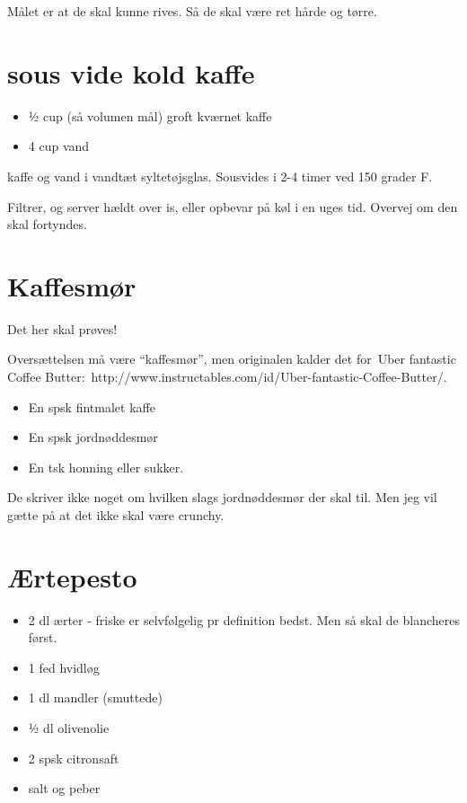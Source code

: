 \documentclass[
  letterpaper,
  DIV=11,
  numbers=noendperiod]{scrreprt}
\providecommand{\tightlist}{%
  \setlength{\itemsep}{0pt}\setlength{\parskip}{0pt}}\usepackage{longtable,booktabs,array}
\begin{document}
Målet er at de skal kunne rives. Så de skal være ret hårde og tørre.

\hypertarget{sous-vide-kold-kaffe}{%
\section{sous vide kold kaffe}\label{sous-vide-kold-kaffe}}

\begin{itemize}
\tightlist
\item
  ½ cup (så volumen mål) groft kværnet kaffe
\item
  4 cup vand
\end{itemize}

kaffe og vand i vandtæt syltetøjsglas. Sousvides i 2-4 timer ved 150
grader F.

Filtrer, og server hældt over is, eller opbevar på køl i en uges tid.
Overvej om den skal fortyndes.

\hypertarget{kaffesmuxf8r}{%
\section{Kaffesmør}\label{kaffesmuxf8r}}

Det her skal prøves!~

Oversættelsen må være ``kaffesmør'', men originalen kalder det for~Uber
fantastic Coffee
Butter:~http://www.instructables.com/id/Uber-fantastic-Coffee-Butter/.

\begin{itemize}
\tightlist
\item
  En spsk fintmalet kaffe
\item
  En spsk jordnøddesmør
\item
  En tsk honning eller sukker.
\end{itemize}

De skriver ikke noget om hvilken slags jordnøddesmør der skal til. Men
jeg vil gætte på at det ikke skal være crunchy.

\hypertarget{uxe6rtepesto}{%
\section{Ærtepesto}\label{uxe6rtepesto}}

\begin{itemize}
\tightlist
\item
  2 dl ærter - friske er selvfølgelig pr definition bedst. Men så skal
  de blancheres først.
\item
  1 fed hvidløg
\item
  1 dl mandler (smuttede)
\item
  ½ dl olivenolie
\item
  2 spsk citronsaft
\item
  salt og peber
\end{itemize}
\end{document}
